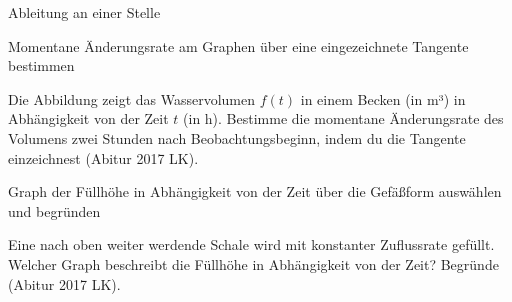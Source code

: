 \begin{aufgabe}{Ableitung an einer Stelle}
\begin{teile}
\begin{ksys}[xmin=-1,xmax=3,ymin=-1,ymax=6,ablesen]\end{ksys}
\end{teile}
\end{aufgabe}

\begin{aufgabe}{Momentane Änderungsrate am Graphen über eine eingezeichnete Tangente bestimmen}
\begin{teile}
\teil Die Abbildung zeigt das Wasservolumen $f(t)$ in einem Becken (in m³) in Abhängigkeit von der Zeit $t$ (in h). Bestimme die momentane Änderungsrate des Volumens zwei Stunden nach Beobachtungsbeginn, indem du die Tangente einzeichnest \hfill (Abitur 2017 LK).

\begin{ksys}[xmin=0,xmax=8,ymin=0,ymax=120,xstep=1,ystep=20,xlabel=t in h,ylabel=V in m³,ablesen]\end{ksys}
\end{teile}
\end{aufgabe}

\begin{aufgabe}{Graph der Füllhöhe in Abhängigkeit von der Zeit über die Gefäßform auswählen und begründen}
\begin{teile}
\teil Eine nach oben weiter werdende Schale wird mit konstanter Zuflussrate gefüllt. Welcher Graph beschreibt die Füllhöhe in Abhängigkeit von der Zeit? Begründe \hfill (Abitur 2017 LK). \\  \\  \\ 
\end{teile}
\end{aufgabe}

